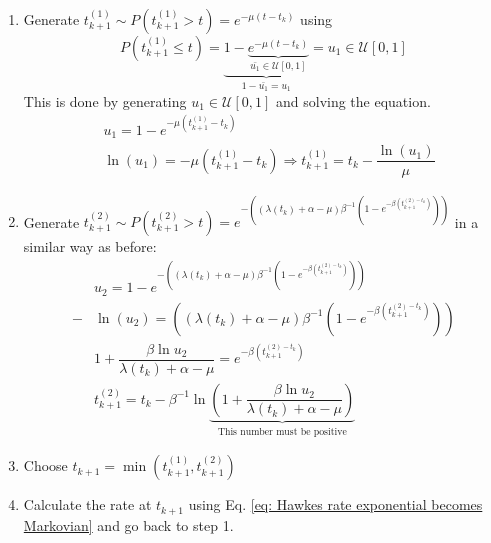 \begin{enumerate}
    \item Generate $t_{k+1}^{(1)}\sim P \left( t_{k+1}^{(1)}>t \right) = e^{-\mu\left( t-t_k \right)}$ using 
    $$P\left( t_{k+1}^{(1)}\leq t \right) = \underbrace{1- \underbrace{e^{-\mu(t-t_k)}}_{\bar{u_1}\in\mathcal{U}[0,1]}}_{1-\bar{u_1}=u_1}=u_1 \in \mathcal{U}[0,1]$$
    This is done by generating $u_1\in\mathcal{U}[0,1]$ and solving the equation.
    \begin{equation}
        \begin{split}
        &u_1=1-e^{-\mu\left( t_{k+1}^{(1)}-t_k \right)}\\
        &\ln(u_1)=-\mu\left( t_{k+1}^{(1)}-t_k  \right)\Rightarrow t_{k+1}^{(1)}=t_k-\dfrac{\ln(u_1)}{\mu}            
        \end{split}
        \label{eq: inter-event time 1}
    \end{equation}
    \item Generate $t_{k+1}^{(2)}\sim P\left( t_{k+1}^{(2)}>t \right)=e^{-\left( \left( \lambda(t_k)+\alpha-\mu \right)\beta^{-1}\left( 1-e^{-\beta\left( t_{k+1}^{(2)-t_k}\right)}\right)\right)}$
    in a similar way as before:
    \begin{equation}
        \begin{split}
            &u_2=1-e^{-\left( \left( \lambda(t_k)+\alpha-\mu \right)\beta^{-1}\left( 1-e^{-\beta\left( t_{k+1}^{(2)-t_k}\right)}\right)\right)}\\
            -&\ln(u_2)=\left( \left( \lambda(t_k)+\alpha-\mu \right)\beta^{-1}\left( 1-e^{-\beta\left( t_{k+1}^{(2)-t_k}\right)}\right)\right)\\ 
            & 1+\dfrac{\beta\ln u_2}{\lambda(t_k)+\alpha-\mu}=e^{-\beta\left( t_{k+1}^{(2)-t_k}\right)}\\
            &t_{k+1}^{(2)}=t_k-\beta^{-1}\ln\underbrace{\left( 1+\dfrac{\beta\ln u_2}{\lambda(t_k)+\alpha-\mu} \right)}_{\text{This number must be positive}}   
        \end{split}
        \label{eq: inter-event time 2}
    \end{equation}   
    \item Choose $t_{k+1}=\min\left( t_{k+1}^{(1)},t_{k+1}^{(2)} \right)$
    \item Calculate the rate at $t_{k+1}$ using Eq. \ref{eq: Hawkes rate exponential becomes Markovian} and go back to step 1.
\end{enumerate}

